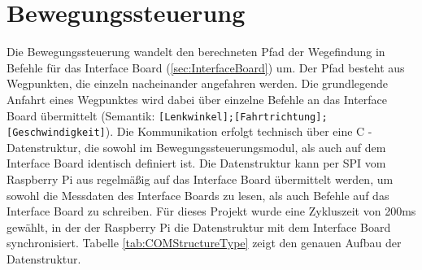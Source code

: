 \section{Bewegungssteuerung}
Die Bewegungssteuerung wandelt den berechneten Pfad der Wegefindung in Befehle für das Interface Board (\ref{sec:InterfaceBoard}) um. Der Pfad besteht aus Wegpunkten, die einzeln nacheinander angefahren werden. Die grundlegende Anfahrt eines Wegpunktes wird dabei über einzelne Befehle an das Interface Board übermittelt (Semantik: \texttt{[Lenkwinkel];[Fahrtrichtung];[Geschwindigkeit]}). Die Kommunikation erfolgt technisch über eine C - Datenstruktur, die sowohl im Bewegungssteuerungsmodul, als auch auf dem Interface Board identisch definiert ist. Die Datenstruktur kann per SPI vom Raspberry Pi aus regelmäßig auf das Interface Board übermittelt werden, um sowohl die Messdaten des Interface Boards zu lesen, als auch Befehle auf das Interface Board zu schreiben. Für dieses Projekt wurde eine Zykluszeit von 200ms gewählt, in der der Raspberry Pi die Datenstruktur mit dem Interface Board synchronisiert. Tabelle \ref{tab:COMStructureType} zeigt den genauen Aufbau der Datenstruktur.


